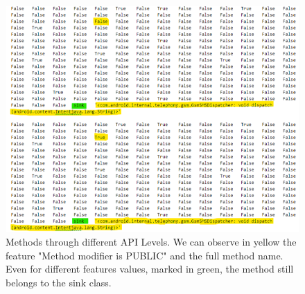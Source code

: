 \begin{figure}[h!]
    \centering
    \renewcommand{\arraystretch}{1.8}
    \includegraphics[width=0.9\linewidth]{images/menthod_though_apis.png}
    \caption{%
    Methods through different API Levels. We can observe in yellow the feature "Method modifier is PUBLIC" and the full method name. Even for different features values, marked in green, the method still belongs to the sink class.%
    }
\end{figure}\label{menthod_though_apis}



